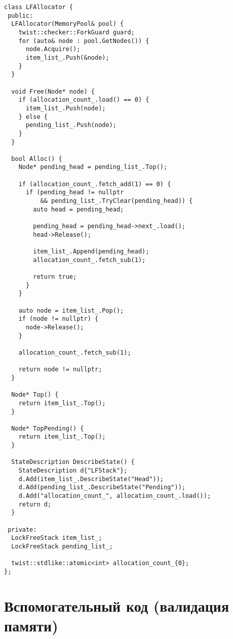 \begin{codebr}
\begin{verbatim}
class LFAllocator {
 public:
  LFAllocator(MemoryPool& pool) {
    twist::checker::ForkGuard guard;
    for (auto& node : pool.GetNodes()) {
      node.Acquire();
      item_list_.Push(&node);
    }
  }

  void Free(Node* node) {
    if (allocation_count_.load() == 0) {
      item_list_.Push(node);
    } else {
      pending_list_.Push(node);
    }
  }

  bool Alloc() {
    Node* pending_head = pending_list_.Top();

    if (allocation_count_.fetch_add(1) == 0) {
      if (pending_head != nullptr
          && pending_list_.TryClear(pending_head)) {
        auto head = pending_head;

        pending_head = pending_head->next_.load();
        head->Release();

        item_list_.Append(pending_head);
        allocation_count_.fetch_sub(1);

        return true;
      }
    }

    auto node = item_list_.Pop();
    if (node != nullptr) {
      node->Release();
    }

    allocation_count_.fetch_sub(1);

    return node != nullptr;
  }

  Node* Top() {
    return item_list_.Top();
  }

  Node* TopPending() {
    return item_list_.Top();
  }

  StateDescription DescribeState() {
    StateDescription d{"LFStack"};
    d.Add(item_list_.DescribeState("Head"));
    d.Add(pending_list_.DescribeState("Pending"));
    d.Add("allocation_count_", allocation_count_.load());
    return d;
  }

 private:
  LockFreeStack item_list_;
  LockFreeStack pending_list_;

  twist::stdlike::atomic<int> allocation_count_{0};
};

\end{verbatim}
	
\end{codebr}

\section{Вспомогательный код (валидация памяти)}

